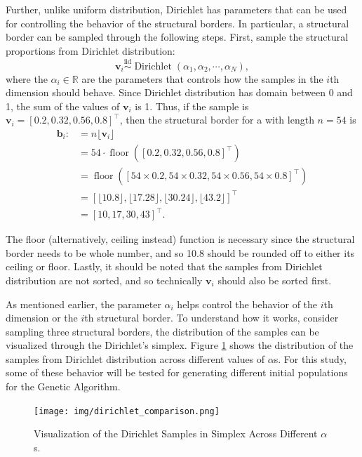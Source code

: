 Further, unlike uniform distribution, Dirichlet has parameters that can be used for controlling the behavior of the structural borders. In particular, a structural border can be sampled through the following steps. First, sample the structural proportions from Dirichlet distribution:
\begin{equation}
    \mathbf{v}_i\overset{\text{iid}}{\sim}\operatorname{Dirichlet}(\alpha_1,\alpha_2,\cdots,\alpha_N),
\end{equation}
where the $\alpha_i\in\mathbb{R}$ are the parameters that controls how the samples in the $i$th dimension should behave. Since Dirichlet distribution has domain between 0 and 1, the sum of the values of $\mathbf{v}_i$ is 1. Thus, if the sample is $\mathbf{v}_i=[0.2, 0.32, 0.56, 0.8]^{\top}$, then the structural border for a   with length $n=54$ is
\begin{align}
    \mathbf{b}_{i}:&=n\lfloor\mathbf{v}_i\rfloor\\
    &=54\cdot\operatorname{floor}([0.2, 0.32, 0.56, 0.8]^{\top})\\
    &=\operatorname{floor}([54\times 0.2, 54\times 0.32, 54\times 0.56, 54\times 0.8]^{\top})\\
    &=[\lfloor 10.8\rfloor, \lfloor 17.28\rfloor , \lfloor 30.24\rfloor , \lfloor 43.2\rfloor ]^{\top}\\
    &=[10, 17, 30, 43]^{\top}.
\end{align}

The floor (alternatively, ceiling instead) function is necessary since the structural border needs to be whole number, and so 10.8 should be rounded off to either its ceiling or floor. Lastly, it should be noted that the samples from Dirichlet distribution are not sorted, and so technically $\mathbf{v}_i$ should also be sorted first. 

As mentioned earlier, the parameter $\alpha_i$ helps control the behavior of the $i$th dimension or the $i$th structural border. To understand how it works, consider sampling three structural borders, the distribution of the samples can be visualized through the Dirichlet's simplex. Figure \ref{fig:result_dirichlet_simplex} shows the distribution of the samples from Dirichlet distribution across different values of $\alpha$s. For this study, some of these behavior will be tested for generating different initial populations for the Genetic Algorithm.

\begin{figure}[!t]
    \centering
    \texttt{[image: img/dirichlet\_comparison.png]}
    \caption{Visualization of the Dirichlet Samples in Simplex Across Different $\alpha$s.}
    \label{fig:result_dirichlet_simplex}
\end{figure}
